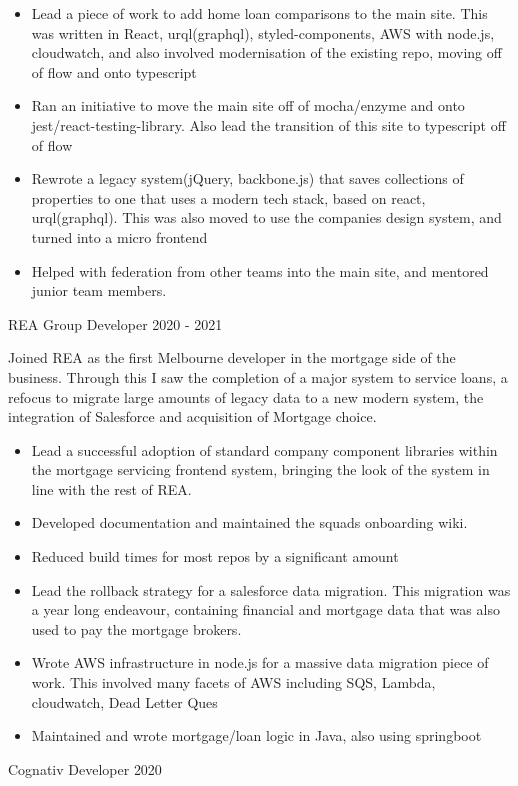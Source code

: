 \documentclass[8pt]{developercv}
\begin{document}
\begin{minipage}[a]{1.0\textwidth}
\begin{entrylist}
{\begin{itemize}
					\item Lead a piece of work to add home loan comparisons to the main site. This was written in React, urql(graphql), styled-components, AWS with node.js, cloudwatch, and also involved modernisation of the existing repo, moving off of flow and onto typescript
					\item Ran an initiative to move the main site off of mocha/enzyme and onto jest/react-testing-library. Also lead the transition of this site to typescript off of flow
					\item Rewrote a legacy system(jQuery, backbone.js) that saves collections of properties to one that uses a modern tech stack, based on react, urql(graphql). This was also moved to use the companies design system, and turned into a micro frontend
					\item Helped with federation from other teams into the main site, and mentored junior team members.
				\end{itemize}								
				}
			\entry
				{REA Group}
				{Developer}
				{2020 - 2021}
				{Joined REA as the first Melbourne developer in the mortgage side of the business. Through this I saw the completion of a major system to service loans, a refocus to migrate large amounts of legacy data to a new modern system, the integration of Salesforce and acquisition of Mortgage choice.
				\begin{itemize}
					\item Lead a successful adoption of standard company component libraries within the mortgage servicing frontend system, bringing the look of the system in line with the rest of REA.
					\item Developed documentation and maintained the squads onboarding wiki.
					\item Reduced build times for most repos by a significant amount
					\item Lead the rollback strategy for a salesforce data migration. This migration was a year long endeavour, containing financial and mortgage data that was also used to pay the mortgage brokers. 
					\item Wrote AWS infrastructure in node.js for a massive data migration piece of work. This involved many facets of AWS including SQS, Lambda, cloudwatch, Dead Letter Ques
					\item Maintained and wrote mortgage/loan logic in Java, also using springboot
				\end{itemize}								
				}
			\entry
				{Cognativ}
				{Developer}
				{2020}
				{}

\end{entrylist}
\end{minipage}
\end{document}
